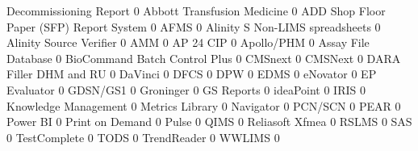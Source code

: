 \documentclass{article}
\begin{document}
\begin{Schunk}
\begin{Soutput}
                                           Decommissioning Report
                                                                0
  Abbott Transfusion Medicine                                   0
  ADD Shop Floor Paper (SFP) Report System                      0
  AFMS                                                          0
  Alinity S Non-LIMS spreadsheets                               0
  Alinity Source Verifier                                       0
  AMM                                                           0
  AP 24 CIP                                                     0
  Apollo/PHM                                                    0
  Assay File Database                                           0
  BioCommand Batch Control Plus                                 0
  CMSnext                                                       0
  CMSNext                                                       0
  DARA Filler DHM and RU                                        0
  DaVinci                                                       0
  DFCS                                                          0
  DPW                                                           0
  EDMS                                                          0
  eNovator                                                      0
  EP Evaluator                                                  0
  GDSN/GS1                                                      0
  Groninger                                                     0
  GS Reports                                                    0
  ideaPoint                                                     0
  IRIS                                                          0
  Knowledge Management                                          0
  Metrics Library                                               0
  Navigator                                                     0
  PCN/SCN                                                       0
  PEAR                                                          0
  Power BI                                                      0
  Print on Demand                                               0
  Pulse                                                         0
  QIMS                                                          0
  Reliasoft Xfmea                                               0
  RSLMS                                                         0
  SAS                                                           0
  TestComplete                                                  0
  TODS                                                          0
  TrendReader                                                   0
  WWLIMS                                                        0
                                          

\end{Soutput}
\end{Schunk}
\end{document}
